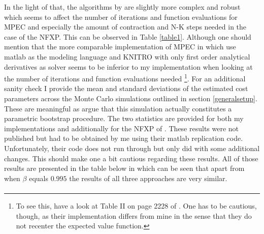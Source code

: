 In the light of that, the algorithms by \citeauthor{Iskhakov.2016} are slightly more complex and robust which seems to affect the number of iterations and function evaluations for MPEC and especially the amount of contraction and N-K steps needed in the case of the NFXP. This can be observed in Table \ref{table1}. Although one should mention that the more comparable implementation of MPEC in which \cite{Su.Judd.2012} use matlab as the modeling language and KNITRO with only first order analytical derivatives as solver seems to be inferior to my implementation when looking at the number of iterations and function evaluations needed \footnote{To see this, have a look at Table II on page 2228 of \cite{Su.Judd.2012}. One has to be cautious, though, as their implementation differs from mine in the sense that they do not recenter the expected value function.}. For an additional sanity check I provide the mean and standard deviations of the estimated cost parameters across the Monte Carlo simulations outlined in section \ref{generalsetup}. These are meaningful as \cite{Su.Judd.2012} argue that this simulation actually constitutes a parametric bootstrap procedure. The two statistics are provided for both my implementations and additionally for the NFXP of \citeauthor{Iskhakov.2016}. These results were not published but had to be obtained by me using their matlab replication code. Unfortunately, their code does not run through but only did with some additional changes. This should make one a bit cautious regarding these results. All of those results are presented in the table below in which can be seen that apart from when $\beta$ equals $0.995$ the results of all three approaches are very similar. \paragraph{}

